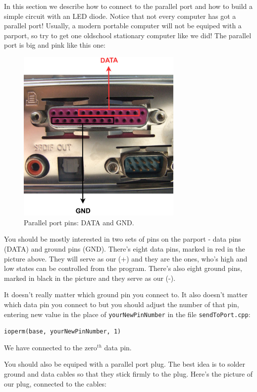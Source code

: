 \documentclass[12pt]{report}
\begin{document}
In this section we describe how to connect to the parallel port and how to build a simple circuit with an LED diode. Notice that not every computer has got a parallel port! Usually, a modern portable computer will not be equiped with a parport, so try to get one oldschool stationary computer like we did! The parallel port is big and pink like this one:

\begin{figure}[H]
\centering\includegraphics[width=8cm]{par_port}
\caption{Parallel port pins: DATA and GND.}				
\label{fig:par_port}
\end{figure}

You should be mostly interested in two sets of pins on the parport - data pins (DATA) and ground pins (GND). There's eight data pins, marked in red in the picture above. They will serve as our (+) and they are the ones, who's high and low states can be controlled from the program. There's also eight ground pins, marked in black in the picture and they serve as our (-).

It doesn't really matter which ground pin you connect to. It also doesn't matter which data pin you connect to but you should adjust the number of that pin, entering new value in the place of \verb|yourNewPinNumber| in the file \verb|sendToPort.cpp|:

\begin{snugshade}
\verb|ioperm(base, yourNewPinNumber, 1)|
\end{snugshade}


We have connected to the zero$^{th}$ data pin.

You should also be equiped with a parallel port plug. The best idea is to solder ground and data cables so that they stick firmly to the plug. Here's the picture of our plug, connected to the cables:
\end{document}
